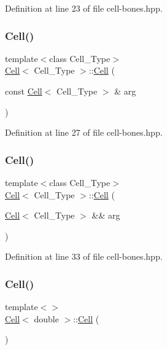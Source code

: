 Definition at line 23 of file cell-\/bones.\+hpp.

\mbox{\label{class_cell_a667a3060f565f033a62038500e81342d}} 
\subsubsection{\texorpdfstring{Cell()}{Cell()}\hspace{0.1cm}{\footnotesize\ttfamily [4/13]}}
{\footnotesize\ttfamily template$<$class Cell\+\_\+\+Type$>$ \\
\hyperlink{class_cell}{Cell}$<$ Cell\+\_\+\+Type $>$\+::\hyperlink{class_cell}{Cell} (\begin{DoxyParamCaption}\item[{const \hyperlink{class_cell}{Cell}$<$ Cell\+\_\+\+Type $>$ \&}]{arg }\end{DoxyParamCaption})\hspace{0.3cm}{\ttfamily [inline]}}



Definition at line 27 of file cell-\/bones.\+hpp.

\mbox{\label{class_cell_a5271bb77921af0a093658cd05fe0738f}} 
\subsubsection{\texorpdfstring{Cell()}{Cell()}\hspace{0.1cm}{\footnotesize\ttfamily [5/13]}}
{\footnotesize\ttfamily template$<$class Cell\+\_\+\+Type$>$ \\
\hyperlink{class_cell}{Cell}$<$ Cell\+\_\+\+Type $>$\+::\hyperlink{class_cell}{Cell} (\begin{DoxyParamCaption}\item[{\hyperlink{class_cell}{Cell}$<$ Cell\+\_\+\+Type $>$ \&\&}]{arg }\end{DoxyParamCaption})\hspace{0.3cm}{\ttfamily [inline]}}



Definition at line 33 of file cell-\/bones.\+hpp.

\mbox{\label{class_cell_a5ecdaddaf4661a9a8fe6f0ed61595847}} 
\subsubsection{\texorpdfstring{Cell()}{Cell()}\hspace{0.1cm}{\footnotesize\ttfamily [6/13]}}
{\footnotesize\ttfamily template$<$$>$ \\
\hyperlink{class_cell}{Cell}$<$ double $>$\+::\hyperlink{class_cell}{Cell} (\begin{DoxyParamCaption}{ }\end{DoxyParamCaption})\hspace{0.3cm}{\ttfamily [inline]}}



